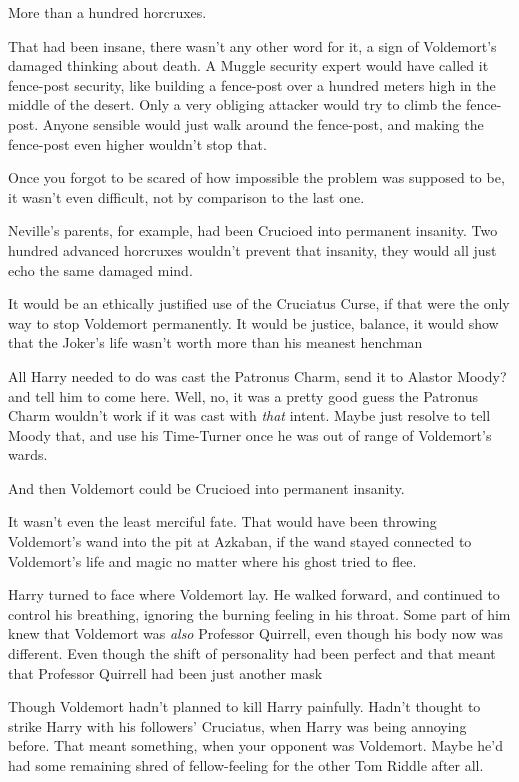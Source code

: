 More than a hundred horcruxes.

That had been insane, there wasn't any other word for it, a sign of Voldemort's
damaged thinking about death. A Muggle security expert would have called it
fence-post security, like building a fence-post over a hundred meters high in
the middle of the desert. Only a very obliging attacker would try to climb the
fence-post. Anyone sensible would just walk around the fence-post, and making
the fence-post even higher wouldn't stop that.

Once you forgot to be scared of how impossible the problem was supposed to be,
it wasn't even difficult, not by comparison to the last one.

Neville's parents, for example, had been Crucioed into permanent insanity. Two
hundred advanced horcruxes wouldn't prevent that insanity, they would all just
echo the same damaged mind.

It would be an ethically justified use of the Cruciatus Curse, if that were the
only way to stop Voldemort permanently. It would be justice, balance, it would
show that the Joker's life wasn't worth more than his meanest henchman{\el}

All Harry needed to do was cast the Patronus Charm, send it to{\el} Alastor
Moody?{\el} and tell him to come here. Well, no, it was a pretty good guess
the Patronus Charm wouldn't work if it was cast with \emph{that} intent. Maybe
just resolve to tell Moody that, and use his Time-Turner once he was out of
range of Voldemort's wards.

And then Voldemort could be Crucioed into permanent insanity.

It wasn't even the least merciful fate. That would have been throwing
Voldemort's wand into the pit at Azkaban, if the wand stayed connected to
Voldemort's life and magic no matter where his ghost tried to flee.

Harry turned to face where Voldemort lay. He walked forward, and continued to
control his breathing, ignoring the burning feeling in his throat. Some part of
him knew that Voldemort was \emph{also} Professor Quirrell, even though his
body now was different. Even though the shift of personality had been perfect
and that meant that Professor Quirrell had been just another mask{\el}

Though Voldemort hadn't planned to kill Harry painfully. Hadn't thought to
strike Harry with his followers' Cruciatus, when Harry was being annoying
before. That meant something, when your opponent was Voldemort. Maybe he'd had
some remaining shred of fellow-feeling for the other Tom Riddle after all.

